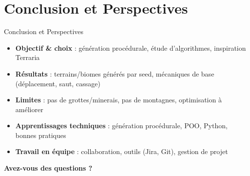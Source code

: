 \documentclass[aspectratio=169]{beamer}
\begin{document}
\section{Conclusion et Perspectives}

\begin{frame}{Conclusion et Perspectives}
    \centering
    \begin{itemize}
        \item \textbf{Objectif \& choix} : génération procédurale, étude d’algorithmes, inspiration Terraria
        \item \textbf{Résultats} : terrains/biomes générés par seed, mécaniques de base (déplacement, saut, cassage)
        \item \textbf{Limites} : pas de grottes/minerais, pas de montagnes, optimisation à améliorer
        \item \textbf{Apprentissages techniques} : génération procédurale, POO, Python, bonnes pratiques
        \item \textbf{Travail en équipe} : collaboration, outils (Jira, Git), gestion de projet
    \end{itemize}
\end{frame}


\begin{frame}{}
    \centering
    \vfill
    \huge\textbf{Avez-vous des questions ?}
    \vfill
\end{frame}
\end{document}
